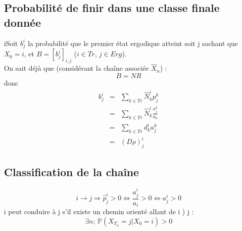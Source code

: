 \subsection{Probabilité de finir dans une classe finale donnée}
iSoit $b_j^i$ la probabilité que le premier état ergodique atteint soit j sachant que $X_0=i$, et $B=[b_j^i]_{i,j}$ ($i\in Tr$, $j\in Erg$). \\
On sait déjà que (considérant la chaîne associée $\hat{X}_n$) :
	\[B=NR\]
donc
\begin{eqnarray*}
	b_j^i&=&\sum_{k\in Tr} \hat{N}_k^i p_j^k\\
	&=&\sum_{k\in Tr} \hat{N}_k^i \frac{a_j^k}{a_k}\\
	&=&\sum_{k\in Tr} d_k^i a_j^k \\
	&=&(D\rho)^i_j
\end{eqnarray*}

\Theo{}{\[B=\hat{N}\hat{R}=D\rho=-\chi^{-1}\rho\]}


\subsection{Classification de la chaîne}
\[i\to j \Rightarrow \hat{p}_j^i>0\Leftrightarrow \frac{a_j^i}{a_i}>0 \Leftrightarrow a_j^i>0\]
i peut conduire à j s'il existe un chemin orienté allant de i ) j :
	\[\exists n;\ \mathbb{P}(X_{T_n}=j|X_0=i)>0\]


